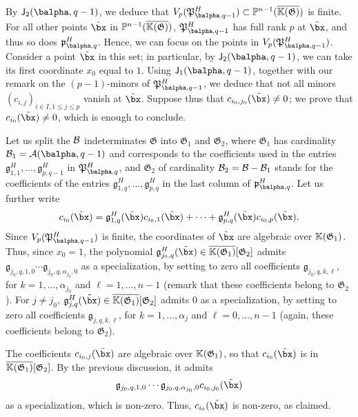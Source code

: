 \documentclass[12pt]{article}
\begin{document}
By $\assI_2(\balpha,q-1)$, we deduce that
$V_p(\mathfrak{P}^H_{\balpha,q-1}) \subset \P^{n-1}(\KKCbar)$ is
finite. For all other points $\tilde\bx$ in $\mathbb{P}^{n-1}(\overline{\mathbb{K}(\mathfrak{G})})$,
$\mathfrak{P}^H_{\balpha,q-1}$ has full rank $p$ at $\tilde\bx$, and
thus so does $\mathfrak{p}^H_{\balpha,q}$. Hence, we can focus on the
points in $V_p(\mathfrak{P}^H_{\balpha,q-1})$.  Consider a point
$\tilde\bx$ in this set; in particular, by $\assI_2(\balpha,q-1)$, we
can take its first coordinate $x_0$ equal to $1$. Using
$\assI_1(\balpha,q-1)$, together with our remark on the $(p-1)$-minors
of $\mathfrak{P}^H_{\balpha,q-1}$, we deduce that not all minors
$(c_{i,j})_{i \in I, 1 \le j \le p}$ vanish at $\tilde\bx$. Suppose
thus that $c_{i_0,j_0}(\tilde\bx) \ne 0$; we prove that
$c_{i_0}(\tilde\bx) \ne 0$, which is enough to conclude.

Let us split the ${\cal B}$ indeterminates $\mathfrak{G}$ into
$\mathfrak{G}_1$ and $\mathfrak{G}_2$, where $\mathfrak{G}_1$ has
cardinality ${\cal B}_1={\cal A}(\balpha,q-1)$ and corresponds to the coefficients
used in the entries
$\mathfrak{g}^H_{1,1},\dots,\mathfrak{g}^H_{p,q-1}$ in
$\mathfrak{P}^H_{\balpha,q}$, and $\mathfrak{G}_2$ of cardinality
${\cal B}_2={\cal B}-{\cal B}_1$ stands for the coefficients of the entries
$\mathfrak{g}^H_{1,q},\dots,\mathfrak{g}^H_{p,q}$ in the last column
of $\mathfrak{p}^H_{\balpha,q}$.  Let us further
write $$c_{i_0}(\tilde\bx)= \mathfrak{g}^H_{1,q}(\tilde\bx)
c_{i_0,1}(\tilde\bx) + \cdots + \mathfrak{g}^H_{p,q}(\tilde\bx)
c_{i_0,p}(\tilde\bx).$$ Since $V_p(\mathfrak{P}^H_{\balpha,q-1})$ is
finite, the coordinates of $\tilde\bx$ are algebraic over
$\mathbb{K}(\mathfrak{G}_1)$.  Thus, since $x_0=1$, the polynomial
$\mathfrak{g}^H_{j_0,q}(\tilde\bx)\in
\overline{\KK(\mathfrak{G}_1)}[\mathfrak{G}_2]$ admits
$\mathfrak{g}_{j_0,q,1,0}\cdots \mathfrak{g}_{j_0,q,\alpha_{j_0},0}$ as a
specialization, by setting to zero all coefficients
$\mathfrak{g}_{j_0,q,k,\ell}$, for $k=1,\dots,\alpha_{j_0}$ and
$\ell=1,\dots,n-1$ (remark that these coefficients belong to $\mathfrak{G}_2$).  For $j \ne
j_0$, $\mathfrak{g}^H_{j,q}(\tilde\bx)\in
\overline{\KK(\mathfrak{G}_1)}[\mathfrak{G}_2]$ admits $0$ as a
specialization, by setting to zero all coefficients
$\mathfrak{g}_{j,q,k,\ell}$, for $k=1,\dots,\alpha_j$ and
$\ell=0,\dots,n-1$ (again, these coefficients belong to $\mathfrak{G}_2$).

The coefficients $c_{i_0,j}(\tilde\bx)$ are algebraic over
$\mathbb{K}(\mathfrak{G}_1)$, so that $c_{i_0}(\tilde\bx)$ is in
$\overline{\mathbb{K}(\mathfrak{G}_1)}[\mathfrak{G}_2]$. By the previous 
discussion, it admits
$$ \mathfrak{g}_{j_0,q,1,0}\cdots \mathfrak{g}_{j_0,q,\alpha_{j_0},0} c_{i_0,j_0}(\tilde\bx)$$ as a
specialization, which is non-zero. Thus,  $c_{i_0}(\tilde\bx)$ 
is non-zero, as claimed.
\end{document}
